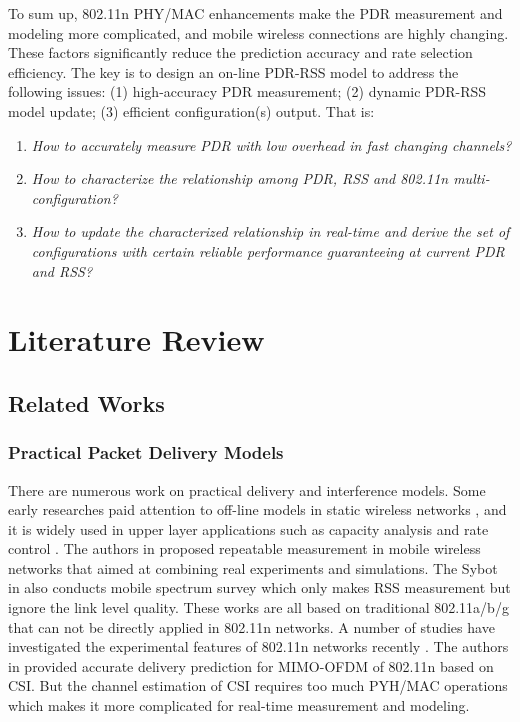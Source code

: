 \documentclass[draftclsnofoot,journal,onecolumn,11pt]{IEEEtran}
\begin{document}
To sum up, 802.11n PHY/MAC enhancements make the PDR measurement and modeling more complicated, and mobile wireless connections are highly changing. These factors significantly reduce the prediction accuracy and rate selection efficiency. The key is to design an on-line PDR-RSS model to address the following issues: (1) high-accuracy PDR measurement; (2) dynamic PDR-RSS model update; (3) efficient configuration(s) output. That is:
\begin{enumerate}
  \item \textit{How to accurately measure PDR with low overhead in fast changing channels?}
  \item \textit{How to characterize the relationship among PDR, RSS and 802.11n multi-configuration?}
  \item \textit{How to update the characterized relationship in real-time and derive the set of configurations with certain reliable performance guaranteeing at current PDR and RSS?}
\end{enumerate}

\section{Literature Review}

\subsection{Related Works}
\subsubsection{Practical Packet Delivery Models}
There are numerous work on practical delivery and interference models. Some early researches paid attention to off-line models in static wireless networks \cite{kolar2011mesh} \cite{reis2006model}, and it is widely used in upper layer applications such as capacity analysis \cite{kashyap2007capacity} and rate control \cite{chen2011ram} \cite{judd2008efficient}. The authors in \cite{10.1109/TMC.2009.87} proposed repeatable measurement in mobile wireless networks that aimed at combining real experiments and simulations. The Sybot in \cite{kim2010sybot} also conducts mobile spectrum survey which only makes RSS measurement but ignore the link level quality. These works are all based on traditional 802.11a/b/g that can not be directly applied in 802.11n networks. A number of studies have investigated the experimental features of 802.11n networks recently \cite{Halperin2010predictable} \cite{k.rayanchu:fluid:}. The authors in \cite{Halperin2010predictable} provided accurate delivery prediction for MIMO-OFDM of 802.11n based on CSI. But the channel estimation of CSI \cite{CSI-SF} requires too much PYH/MAC operations which makes it more complicated for real-time measurement and modeling.
\end{document}
